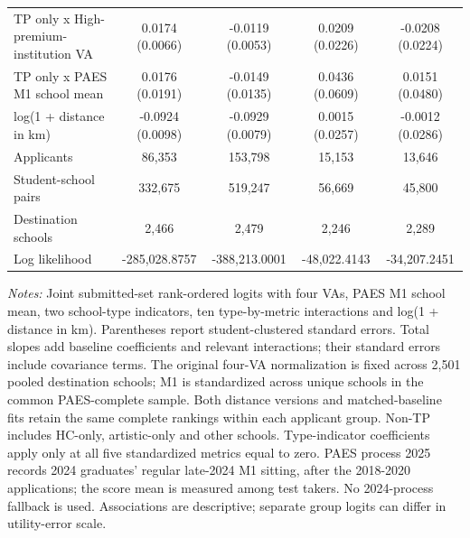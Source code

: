 \begin{table}[!htbp]
{\begin{tabular}{lcccc}
TP only x High-premium-institution VA & 0.0174 (0.0066) & -0.0119 (0.0053) & 0.0209 (0.0226) & -0.0208 (0.0224) \\
TP only x PAES M1 school mean & 0.0176 (0.0191) & -0.0149 (0.0135) & 0.0436 (0.0609) & 0.0151 (0.0480) \\
log(1 + distance in km) & -0.0924 (0.0098) & -0.0929 (0.0079) & 0.0015 (0.0257) & -0.0012 (0.0286) \\
\midrule
Applicants & 86,353 & 153,798 & 15,153 & 13,646 \\
Student-school pairs & 332,675 & 519,247 & 56,669 & 45,800 \\
Destination schools & 2,466 & 2,479 & 2,246 & 2,289 \\
Log likelihood & -285,028.8757 & -388,213.0001 & -48,022.4143 & -34,207.2451 \\
\bottomrule
\end{tabular}
}
\par\smallskip
\begin{minipage}{0.98\linewidth}\footnotesize
\textit{Notes:} Joint submitted-set rank-ordered logits with four VAs, PAES M1 school mean, two school-type indicators, ten type-by-metric interactions and log(1 + distance in km). Parentheses report student-clustered standard errors. Total slopes add baseline coefficients and relevant interactions; their standard errors include covariance terms. The original four-VA normalization is fixed across 2,501 pooled destination schools; M1 is standardized across unique schools in the common PAES-complete sample. Both distance versions and matched-baseline fits retain the same complete rankings within each applicant group. Non-TP includes HC-only, artistic-only and other schools. Type-indicator coefficients apply only at all five standardized metrics equal to zero. PAES process 2025 records 2024 graduates' regular late-2024 M1 sitting, after the 2018-2020 applications; the score mean is measured among test takers. No 2024-process fallback is used. Associations are descriptive; separate group logits can differ in utility-error scale.
\end{minipage}
\end{table}
